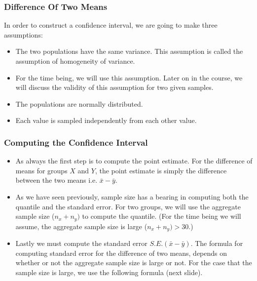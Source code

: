 \documentclass[a4]{beamer}
\begin{document}
\begin{frame}
\frametitle{Difference Of Two Means}
In order to construct a confidence interval, we are going to make three assumptions:

\begin{itemize}
\item The two populations have the same variance. This assumption is called the assumption of homogeneity of variance.
\item For the time being, we will use this assumption. Later on in the course, we will discuss the validity of this assumption for two given samples.
\item The populations are normally distributed.
\item Each value is sampled independently from each other value.
\end{itemize}
\end{frame}

\begin{frame}
\frametitle{Computing the Confidence Interval}

\begin{itemize}
\item As always the first step is to compute the point estimate. For the difference of means for groups $X$ and $Y$, the point estimate is simply the difference between the two means i.e. $\bar{x} - \bar{y}$.

\item As we have seen previously, sample size has a bearing in computing both the quantile and the standard error.
For two groups, we will use the aggregate sample size ($n_x+n_y)$ to compute the quantile. (For the time being we will assume, the aggregate sample size is large ($n_x+n_y)> 30$.)

\item Lastly we must compute the standard error $S.E.(\bar{x}-\bar{y})$. The formula for computing standard error for the difference of two means, depends on whether or not the aggregate sample size is large or not. For the case that the sample size is large, we use the following formula (next slide).
\end{itemize}
\end{frame}
\end{document}
